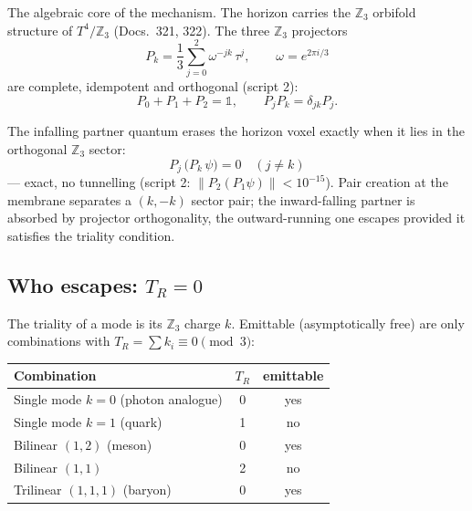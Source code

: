 The algebraic core of the mechanism. The horizon carries the
$\mathbb{Z}_3$ orbifold structure of $T^4/\mathbb{Z}_3$ (Docs.\ 321, 322).
The three $\mathbb{Z}_3$ projectors
\begin{equation}
  P_k = \frac{1}{3}\sum_{j=0}^{2}\omega^{-jk}\,\tau^j,
  \qquad \omega = e^{2\pi i/3}
\end{equation}
are complete, idempotent and orthogonal (script 2):
\begin{equation}
  P_0 + P_1 + P_2 = \mathbb{1},\qquad
  P_j P_k = \delta_{jk}P_j.
\end{equation}

\begin{tcolorbox}[ffgftbox, title={Absorption \B}]
  The infalling partner quantum erases the horizon voxel exactly when
  it lies in the orthogonal $\mathbb{Z}_3$ sector:
  \begin{equation}
    P_j\,\bigl(P_k\,\psi\bigr) = 0 \quad (j \neq k)
  \end{equation}
  — exact, no tunnelling (script 2: $\|P_2(P_1\psi)\| < 10^{-15}$).
  Pair creation at the membrane separates a $(k,-k)$ sector pair;
  the inward-falling partner is absorbed by projector orthogonality,
  the outward-running one escapes provided it satisfies the triality
  condition.
\end{tcolorbox}

\subsection{Who escapes: \texorpdfstring{$T_R = 0$}{TR=0}}

The triality of a mode is its $\mathbb{Z}_3$ charge $k$.
Emittable (asymptotically free) are only combinations with
$T_R = \sum k_i \equiv 0 \pmod 3$:

\begin{center}
\small
\begin{tabular}{@{}lcc@{}}
  \toprule
  Combination & $T_R$ & emittable \\
  \midrule
  Single mode $k=0$ (photon analogue) & 0 & yes \\
  Single mode $k=1$ (quark) & 1 & no \\
  Bilinear $(1,2)$ (meson) & 0 & yes \\
  Bilinear $(1,1)$ & 2 & no \\
  Trilinear $(1,1,1)$ (baryon) & 0 & yes \\
  \bottomrule
\end{tabular}
\end{center}

